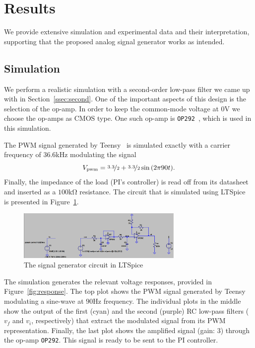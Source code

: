 \section{Results}

We provide extensive simulation and experimental data and their interpretation,
supporting that the proposed analog signal generator works as intended.

\vspace{-1em}
\subsection{Simulation}
\vspace{-1em}

We perform a realistic simulation with a second-order low-pass filter we came up
with in Section~\ref{ssec:second}. One of the important aspects of this design
is the selection of the op-amp. In order to keep the common-mode voltage at
$0$\unit{\volt} we choose the op-amps as CMOS type. One such op-amp is
\texttt{OP292}~\cite{op292}, which is used in this simulation.

The PWM signal generated by Teensy~\cite{teensy} is simulated exactly with a
carrier frequency of $36.6$\unit{\kilo\hertz} modulating the signal \[
V_{\text{pwm}} = \nicefrac{3.3}{2} + \nicefrac{3.3}{2}\sin{(2\pi 90 t)}.\]
Finally, the impedance of the load (PI's controller) is read off from its
datasheet and inserted as a $100$\unit{\kilo\ohm} resistance. The circuit that
is simulated using LTSpice~\cite{ltspice} is presented in
Figure~\ref{fig:real_sig_gen}.

\begin{figure}[htb] 
\includegraphics[width=8cm]{./figures/circuit.png}
\caption{The signal generator circuit in LTSpice} 
\label{fig:real_sig_gen}
\end{figure}

The simulation generates the relevant voltage responses, provided in
Figure~\ref{fig:response}. The top plot shows the PWM signal generated by Teensy
modulating a sine-wave at $90$\unit{\hertz} frequency. The individual plots in
the middle show the output of the first (cyan) and the second (purple) RC
low-pass filters ($v_f$ and $v_i$, respectively) that extract the modulated
signal from its PWM representation. Finally, the last plot shows the amplified
signal (gain: $3$) through the op-amp \texttt{OP292}. This signal is ready to be
sent to the PI controller.


